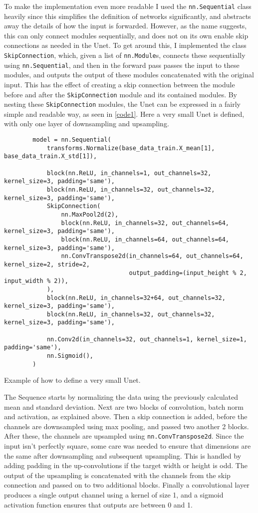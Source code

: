 \documentclass[a4paper, 12pt]{article}
\begin{document}
To make the implementation even more readable I used the \texttt{nn.Sequential} class heavily since this simplifies the definition of networks significantly, and abstracts away the details of how the input is forwarded. However, as the name suggests, this can only connect modules sequentially, and does not on its own enable skip connections as needed in the Unet. To get around this, I implemented the class \texttt{SkipConnection}, which, given a list of \texttt{nn.Module}s, connects these sequentially using \texttt{nn.Sequential}, and then in the forward pass passes the input to these modules, and outputs the output of these modules concatenated with the original input. This has the effect of creating a skip connection between the module before and after the \texttt{SkipConnection} module and its contained modules. By nesting these \texttt{SkipConnection} modules, the Unet can be expressed in a fairly simple and readable way, as seen in \autoref{code1}. Here a very small Unet is defined, with only one layer of downsampling and upsampling.

\begin{listing}[H]
	\begin{verbatim}
		model = nn.Sequential(
			transforms.Normalize(base_data_train.X_mean[1], base_data_train.X_std[1]),
			
			block(nn.ReLU, in_channels=1, out_channels=32, kernel_size=3, padding='same'),
			block(nn.ReLU, in_channels=32, out_channels=32, kernel_size=3, padding='same'),
			SkipConnection(
				nn.MaxPool2d(2),
				block(nn.ReLU, in_channels=32, out_channels=64, kernel_size=3, padding='same'),
				block(nn.ReLU, in_channels=64, out_channels=64, kernel_size=3, padding='same'),
				nn.ConvTranspose2d(in_channels=64, out_channels=64, kernel_size=2, stride=2,
				                   output_padding=(input_height % 2, input_width % 2)),
			),
			block(nn.ReLU, in_channels=32+64, out_channels=32, kernel_size=3, padding='same'),
			block(nn.ReLU, in_channels=32, out_channels=32, kernel_size=3, padding='same'),
			
			nn.Conv2d(in_channels=32, out_channels=1, kernel_size=1, padding='same'),
			nn.Sigmoid(),
		)
	\end{verbatim}
	\caption{Example of how to define a very small Unet.}
	\label{code1}
\end{listing}

The Sequence starts by normalizing the data using the previously calculated mean and standard deviation. Next are two blocks of convolution, batch norm and activation, as explained above. Then a skip connection is added, before the channels are downsampled using max pooling, and passed two another 2 blocks. After these, the channels are upsampled using \texttt{nn.ConvTranspose2d}. Since the input isn't perfectly square, some care was needed to ensure that dimensions are the same after downsampling and subsequent upsampling. This is handled by adding padding in the up-convolutions if the target width or height is odd. The output of the upsampling is concatenated with the channels from the skip connection and passed on to two additional blocks. Finally a convolutional layer produces a single output channel using a kernel of size 1, and a sigmoid activation function ensures that outputs are between 0 and 1. 
\end{document}

